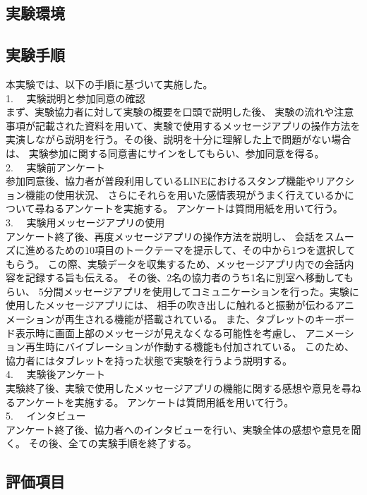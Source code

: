 \documentclass[11pt,a4paper]{ltjsreport}
\begin{document}
\subsection{実験環境}

\subsection{実験手順}
本実験では、以下の手順に基づいて実施した。\\
1.　 実験説明と参加同意の確認\\
まず、実験協力者に対して実験の概要を口頭で説明した後、
実験の流れや注意事項が記載された資料を用いて、実験で使用するメッセージアプリの操作方法を
実演しながら説明を行う。その後、説明を十分に理解した上で問題がない場合は、
実験参加に関する同意書にサインをしてもらい、参加同意を得る。\\
2. 　実験前アンケート\\
参加同意後、協力者が普段利用しているLINEにおけるスタンプ機能やリアクション機能の使用状況、
さらにそれらを用いた感情表現がうまく行えているかについて尋ねるアンケートを実施する。
アンケートは質問用紙を用いて行う。\\
3. 　実験用メッセージアプリの使用\\
アンケート終了後、再度メッセージアプリの操作方法を説明し、
会話をスムーズに進めるための10項目のトークテーマを提示して、その中から1つを選択してもらう。
この際、実験データを収集するため、メッセージアプリ内での会話内容を記録する旨も伝える。
その後、2名の協力者のうち1名に別室へ移動してもらい、
5分間メッセージアプリを使用してコミュニケーションを行った。実験に使用したメッセージアプリには、
相手の吹き出しに触れると振動が伝わるアニメーションが再生される機能が搭載されている。
また、タブレットのキーボード表示時に画面上部のメッセージが見えなくなる可能性を考慮し、
アニメーション再生時にバイブレーションが作動する機能も付加されている。
このため、協力者にはタブレットを持った状態で実験を行うよう説明する。\\
4. 　実験後アンケート\\
実験終了後、実験で使用したメッセージアプリの機能に関する感想や意見を尋ねるアンケートを実施する。
アンケートは質問用紙を用いて行う。\\
5. 　インタビュー\\
アンケート終了後、協力者へのインタビューを行い、実験全体の感想や意見を聞く。
その後、全ての実験手順を終了する。\\

\subsection{評価項目}
\end{document}
